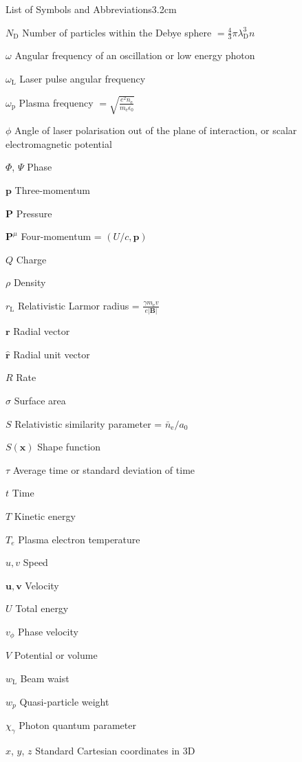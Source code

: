 \begin{mclistof}{List of Symbols and Abbreviations}{3.2cm}
\item[$N_\mathrm{D}$] Number of particles within the Debye sphere $= \frac{4}{3}\pi \lambda^3_\mathrm{D}n$
\item[$\omega$] Angular frequency of an oscillation or low energy photon
\item[$\omega_\mathrm{L}$] Laser pulse angular frequency
\item[$\omega_\mathrm{p}$] Plasma frequency $= \sqrt{\frac{e^2n_\mathrm{e}}{m_\mathrm{e}\epsilon_0}}$
\item[$\phi$] Angle of laser polarisation out of the plane of interaction, or scalar electromagnetic potential
\item[$\Phi$, $\Psi$] Phase
\item[$\mathbf{p}$] Three-momentum
\item[$\mathbf{P}$] Pressure
\item[$\mathbf{P}^\mu$] Four-momentum = $(U/c, \mathbf{p})$
\item[$Q$] Charge
\item[$\rho$] Density
\item[$r_\mathrm{L}$] Relativistic Larmor radius  = $\frac{\gamma m_\mathrm{e} v}{e|\mathbf{B}|}$
\item[$\mathbf{r}$] Radial vector
\item[$\hat{\mathbf{r}}$] Radial unit vector
\item[$R$] Rate
\item[$\sigma$] Surface area
\item[$S$] Relativistic similarity parameter = $\bar{n}_\mathrm{e}/a_0$
\item[$S(\mathbf{x})$] Shape function
\item[$\tau$] Average time or standard deviation of time
\item[$t$] Time
\item[$T$] Kinetic energy
\item[$T_e$] Plasma electron temperature
\item[$u,v$] Speed
\item[$\mathbf{u},\mathbf{v}$] Velocity
\item[$U$] Total energy
\item[$v_\phi$] Phase velocity
\item[$V$] Potential or volume
\item[$w_\mathrm{L}$] Beam waist
\item[$w_p$] Quasi-particle weight
\item[$\chi_\gamma$] Photon quantum parameter
\item[$x$, $y$, $z$] Standard Cartesian coordinates in 3D

\end{mclistof}
